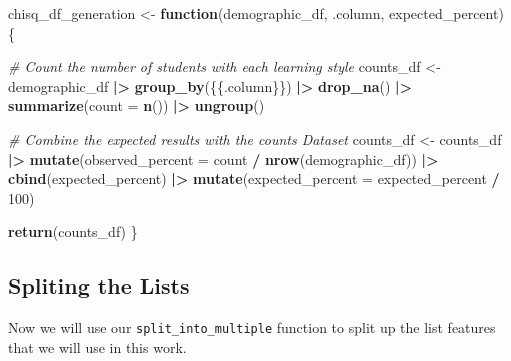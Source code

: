 \documentclass[
  twocolumn]{article}
\newenvironment{Shaded}{\begin{snugshade}}{\end{snugshade}}
\newcommand{\AttributeTok}[1]{\textcolor[rgb]{0.13,0.29,0.53}{#1}}
\newcommand{\CommentTok}[1]{\textcolor[rgb]{0.56,0.35,0.01}{\textit{#1}}}
\newcommand{\ControlFlowTok}[1]{\textcolor[rgb]{0.13,0.29,0.53}{\textbf{#1}}}
\newcommand{\DecValTok}[1]{\textcolor[rgb]{0.00,0.00,0.81}{#1}}
\newcommand{\FunctionTok}[1]{\textcolor[rgb]{0.13,0.29,0.53}{\textbf{#1}}}
\newcommand{\NormalTok}[1]{#1}
\newcommand{\OtherTok}[1]{\textcolor[rgb]{0.56,0.35,0.01}{#1}}
\newcommand{\SpecialCharTok}[1]{\textcolor[rgb]{0.81,0.36,0.00}{\textbf{#1}}}
\begin{document}
\begin{Shaded}
\begin{Highlighting}[]
\NormalTok{chisq\_df\_generation }\OtherTok{\textless{}{-}} \ControlFlowTok{function}\NormalTok{(demographic\_df, .column, expected\_percent) \{}
  
  \CommentTok{\# Count the number of students with each learning style}
\NormalTok{  counts\_df }\OtherTok{\textless{}{-}}\NormalTok{ demographic\_df }\SpecialCharTok{|\textgreater{}}
    \FunctionTok{group\_by}\NormalTok{(\{\{.column\}\}) }\SpecialCharTok{|\textgreater{}}
    \FunctionTok{drop\_na}\NormalTok{() }\SpecialCharTok{|\textgreater{}}
    \FunctionTok{summarize}\NormalTok{(}\AttributeTok{count =} \FunctionTok{n}\NormalTok{()) }\SpecialCharTok{|\textgreater{}}
    \FunctionTok{ungroup}\NormalTok{()}
  
  \CommentTok{\# Combine the expected results with the counts Dataset}
\NormalTok{  counts\_df }\OtherTok{\textless{}{-}}\NormalTok{ counts\_df }\SpecialCharTok{|\textgreater{}}
    \FunctionTok{mutate}\NormalTok{(}\AttributeTok{observed\_percent =}\NormalTok{ count }\SpecialCharTok{/} \FunctionTok{nrow}\NormalTok{(demographic\_df)) }\SpecialCharTok{|\textgreater{}}
    \FunctionTok{cbind}\NormalTok{(expected\_percent) }\SpecialCharTok{|\textgreater{}}
    \FunctionTok{mutate}\NormalTok{(}\AttributeTok{expected\_percent =}\NormalTok{ expected\_percent }\SpecialCharTok{/} \DecValTok{100}\NormalTok{)}
  
  \FunctionTok{return}\NormalTok{(counts\_df)}
\NormalTok{\}}
\end{Highlighting}
\end{Shaded}

\subsection{Spliting the Lists}\label{spliting-the-lists}

Now we will use our \texttt{split\_into\_multiple} function to split up
the list features that we will use in this work.
\end{document}
